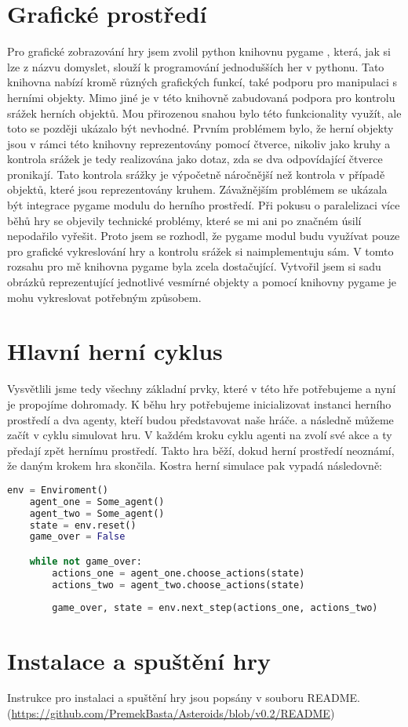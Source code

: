 \section{Grafické prostředí}
Pro grafické zobrazování hry jsem zvolil python knihovnu pygame \cite{pygame}, která, jak si lze z názvu domyslet, slouží k programování jednodušších her v pythonu.
Tato knihovna nabízí kromě různých grafických funkcí, také podporu pro manipulaci s herními objekty. Mimo jiné je v této knihovně zabudovaná podpora pro kontrolu srážek herních objektů.
Mou přirozenou snahou bylo této funkcionality využít, ale toto se později ukázalo být nevhodné.
Prvním problémem bylo, že herní objekty jsou v rámci této knihovny reprezentovány pomocí čtverce, nikoliv jako kruhy a kontrola srážek je tedy realizována jako dotaz, zda se dva odpovídající čtverce pronikají.
Tato kontrola srážky je výpočetně náročnější než kontrola v případě objektů, které jsou reprezentovány kruhem.  
Závažnějším problémem se ukázala být integrace pygame modulu do herního prostředí. Při pokusu o paralelizaci více běhů hry se objevily technické problémy, které se mi ani po značném úsilí nepodařilo vyřešit.
Proto jsem se rozhodl, že pygame modul budu využívat pouze pro grafické vykreslování hry a kontrolu srážek si naimplementuju sám.
V tomto rozsahu pro mě knihovna pygame byla zcela dostačující. Vytvořil jsem si sadu obrázků reprezentující jednotlivé vesmírné objekty a pomocí knihovny pygame je mohu vykreslovat potřebným způsobem.


\section{Hlavní herní cyklus}
Vysvětlili jsme tedy všechny základní prvky, které v této hře potřebujeme a nyní je propojíme dohromady.
K běhu hry potřebujeme inicializovat instanci herního prostředí a dva agenty, kteří budou představovat naše hráče.
a následně můžeme začít v cyklu simulovat hru.
V každém kroku cyklu agenti na zvolí své akce a ty předají zpět hernímu prostředí.
Takto hra běží, dokud herní prostředí neoznámí, že daným krokem hra skončila.
Kostra herní simulace pak vypadá následovně:

\begin{lstlisting}[language=Python]
    env = Enviroment()
    agent_one = Some_agent()
    agent_two = Some_agent()    
    state = env.reset()
    game_over = False

    while not game_over:
        actions_one = agent_one.choose_actions(state)    
        actions_two = agent_two.choose_actions(state)
        
        game_over, state = env.next_step(actions_one, actions_two)
\end{lstlisting}


\section{Instalace a spuštění hry}
Instrukce pro instalaci a spuštění hry jsou popsány v souboru README. (\url{https://github.com/PremekBasta/Asteroids/blob/v0.2/README})

